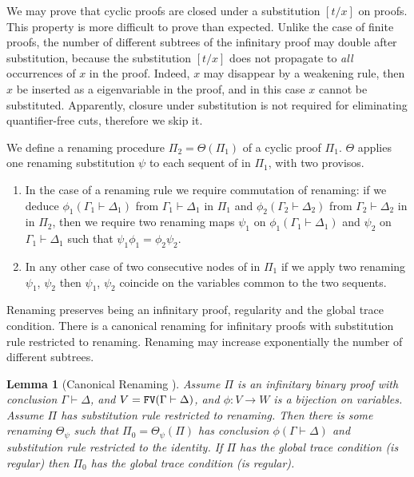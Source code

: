 \documentclass[a4paper,12pt]{article}
\newtheorem{lemma}[theorem]{Lemma}
\newcommand{\FV}              { {\tt FV} }
\begin{document}
We may prove that cyclic proofs are closed under a substitution $[t/x]$ on proofs. This property is more difficult to prove than expected. Unlike the case of finite proofs, the number of different subtrees of the infinitary proof may double after substitution, because the substitution $[t/x]$ does not propagate to \emph{all} occurrences of $x$ in the proof. Indeed, $x$ may disappear by a weakening rule, then $x$ be inserted as a eigenvariable in the proof, and in this case $x$ cannot be substituted. Apparently, closure under substitution is not required for eliminating quantifier-free cuts, therefore we skip it.

We define a renaming procedure $\Pi_2 = \Theta(\Pi_1)$ of a cyclic proof $\Pi_1$. $\Theta$ applies one renaming substitution $\psi$ to each sequent of in $\Pi_1$, with two provisos. 
\begin{enumerate}
\item
In the case of a renaming rule we require commutation of renaming: if we deduce $\phi_1(\Gamma_1 \vdash \Delta_1)$ from $\Gamma_1 \vdash \Delta_1$ in $\Pi_1$ and $\phi_2(\Gamma_2 \vdash \Delta_2)$ from $\Gamma_2 \vdash \Delta_2$ in in $\Pi_2$,  then we require two renaming maps $\psi_1$ on $\phi_1(\Gamma_1 \vdash \Delta_1)$ and $\psi_2$ on $\Gamma_1 \vdash \Delta_1$ such that $\psi_1 \phi_1 = \phi_2 \psi_2$. 
\item
In any other case of two consecutive nodes of in $\Pi_1$ if we apply two renaming $\psi_1$, $\psi_2$ then $\psi_1$, $\psi_2$ coincide on the variables common to the two sequents. 
\end{enumerate}
Renaming preserves being an infinitary proof, regularity and the global trace condition. There is a canonical renaming for infinitary proofs with substitution rule restricted to renaming. Renaming may increase exponentially the number of different subtrees.

\begin{lemma}[Canonical Renaming ]
\label{lemma-renaming}
Assume $\Pi$ is an infinitary binary proof with conclusion $\Gamma \vdash \Delta$, and $V = \FV(\Gamma \vdash \Delta)$, and $\phi:V \rightarrow W$ is a bijection on variables. Assume $\Pi$ has substitution rule restricted to renaming. Then there is some renaming $\Theta_\psi$ such that $\Pi_0 =\Theta_\psi(\Pi)$ has conclusion $\phi(\Gamma \vdash \Delta)$ and substitution rule restricted to the identity. If $\Pi$ has the global trace condition (is regular) then $\Pi_0$ has the global trace condition (is regular).
\end{lemma}
\end{document}
